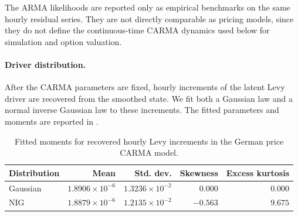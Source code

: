 \begin{table}[!htbp]
  \centering
  \caption{Discrete-time ARMA log-likelihood benchmarks on the same
  deseasonalized German log-price residuals. These benchmarks are not used for
  pricing.}
  \label{tab:price-loglik-comparison}
  \small
\end{table}

The ARMA likelihoods are reported only as empirical benchmarks on the same
hourly residual series. They are not directly comparable as pricing models,
since they do not define the continuous-time CARMA dynamics used below for
simulation and option valuation.

\paragraph{Driver distribution.}
After the CARMA parameters are fixed, hourly increments of the latent Levy
driver are recovered from the smoothed state. We fit both a Gaussian law and a
normal inverse Gaussian law to these increments. The fitted parameters and
moments are reported in .

\begin{table}[!htbp]
  \centering
  \caption{Fitted moments for recovered hourly Levy increments in the German
  price CARMA model.}
  \label{tab:price-driver-distribution}
  \begin{tabular}{lrrrr}
    \toprule
    Distribution & Mean & Std. dev. & Skewness & Excess kurtosis \\
    \midrule
    Gaussian & \(1.8906{\times}10^{-6}\) & \(1.3236{\times}10^{-2}\)
    & \(0.000\) & \(0.000\) \\
    NIG & \(1.8879{\times}10^{-6}\) & \(1.2135{\times}10^{-2}\)
    & \(-0.563\) & \(9.675\) \\
    \bottomrule
  \end{tabular}
\end{table}

